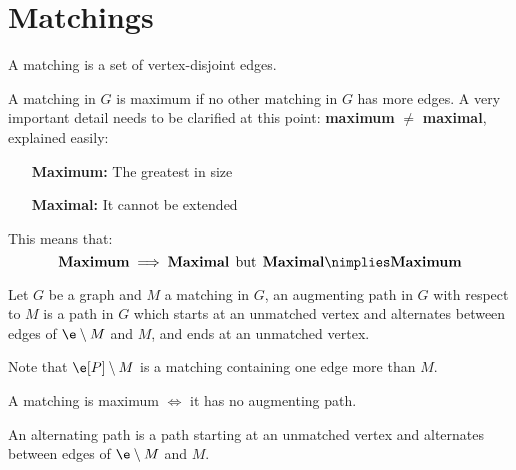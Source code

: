 \chapter{Matchings}
\begin{definition}[Matching]
    A matching is a set of vertex-disjoint edges.    
\end{definition}
A matching in $G$ is maximum if no other matching in $G$ has more edges. A very important detail needs to be clarified at this point: \textbf{maximum} $\neq$ \textbf{maximal}, explained easily:
\begin{itemize}
    \item [\textbf{Maximum:}] The greatest in size
    \item [\textbf{Maximal:}] It cannot be extended
\end{itemize}
This means that:
\begin{equation}
    \text{\textbf{Maximum}} \implies \text{\textbf{Maximal}} \:\:\text{but}\:\: \text{\textbf{Maximal}} \nimplies \text{\textbf{Maximum}}
\end{equation}
\begin{definition}
    Let $G$ be a graph and $M$ a matching in $G$, an augmenting path in $G$ with respect to $M$ is a path in $G$ which starts at an unmatched vertex and alternates between edges of $\e \setminus M$ and $M$, and ends at an unmatched vertex.    
\end{definition}
Note that $\e[P] \setminus M$ is a matching containing one edge more than $M$.
\begin{customlemma}{2.1}
\label{lemma:2.1}
    A matching is maximum $\iff$ it has no augmenting path.
\end{customlemma}
An alternating path is a path starting at an unmatched vertex and alternates between edges of $\e \setminus M$ and $M$.
